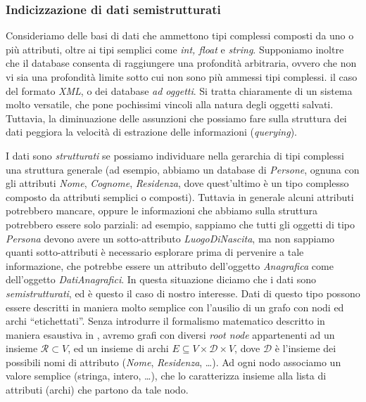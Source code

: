 \subsubsection{Indicizzazione di dati semistrutturati \cite{milo}}
Consideriamo delle basi di dati che ammettono tipi complessi composti da uno o più attributi, oltre ai tipi semplici come \emph{int, float} e \emph{string}. Supponiamo inoltre che il database consenta di raggiungere una profondità arbitraria, ovvero che non vi sia una profondità limite sotto cui non sono più ammessi tipi complessi. \accente il caso del formato \emph{XML}, o dei database \emph{ad oggetti}. Si tratta chiaramente di un sistema molto versatile, che pone pochissimi vincoli alla natura degli oggetti salvati. Tuttavia, la diminuazione delle assunzioni che possiamo fare sulla struttura dei dati peggiora la velocità di estrazione delle informazioni (\emph{querying}).

I dati sono \emph{strutturati} se possiamo individuare nella gerarchia di tipi complessi una struttura generale (ad esempio, abbiamo un database di \emph{Persone}, ognuna con gli attributi \emph{Nome}, \emph{Cognome}, \emph{Residenza}, dove quest'ultimo è un tipo complesso composto da attributi semplici o composti). Tuttavia in generale alcuni attributi potrebbero mancare, oppure le informazioni che abbiamo sulla struttura potrebbero essere solo parziali: ad esempio, sappiamo che tutti gli oggetti di tipo \emph{Persona} devono avere un sotto-attributo \emph{LuogoDiNascita}, ma non sappiamo quanti sotto-attributi è necessario esplorare prima di pervenire a tale informazione, che potrebbe essere un attributo dell'oggetto \emph{Anagrafica} come dell'oggetto \emph{DatiAnagrafici}. In questa situazione diciamo che i dati sono \emph{semistrutturati}, ed è questo il caso di nostro interesse. Dati di questo tipo possono essere descritti in maniera molto semplice con l'ausilio di un grafo con nodi ed archi ``etichettati''. Senza introdurre il formalismo matematico descritto in maniera esaustiva in \cite{milo}, avremo grafi con diversi \emph{root node} appartenenti ad un insieme $\mathcal{R} \subset V$, ed un insieme di archi $E \subseteq V \times \mathcal{D} \times V$, dove $\mathcal{D}$ è l'insieme dei possibili nomi di attributo (\emph{Nome}, \emph{Residenza}, \dots). Ad ogni nodo associamo un valore semplice (stringa, intero, \dots), che lo caratterizza insieme alla lista di attributi (archi) che partono da tale nodo.

